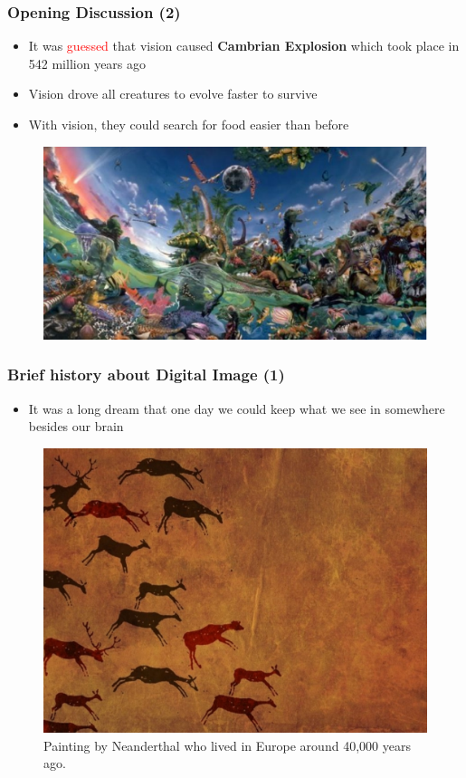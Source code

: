 \begin{frame}
 \frametitle{Opening Discussion (2)}
\begin{itemize}
 	\item {It was \textcolor{red}{guessed} that vision caused \textbf{Cambrian Explosion} which took place in 542 million years ago}
 	\item {Vision drove all creatures to evolve faster to survive}
 	\item {With vision, they could search for food easier than before}
 \end{itemize} 
 \begin{figure}
\begin{center}
	\includegraphics[width=0.80\linewidth]{./figs/cambrian.pdf}
\end{center}
\end{figure}

\end{frame}

\begin{frame}
 \frametitle{Brief history about Digital Image (1)}
 \begin{itemize}
 	\item {It was a long dream that one day we could keep what we see in somewhere besides our brain}
 \end{itemize}
 \begin{figure}
\begin{center}
	\includegraphics[width=0.6\linewidth]{./figs/neanderthal_paint.pdf}
\end{center}
\caption{Painting by Neanderthal who lived in Europe around 40,000 years ago.}
\end{figure}
\end{frame}


